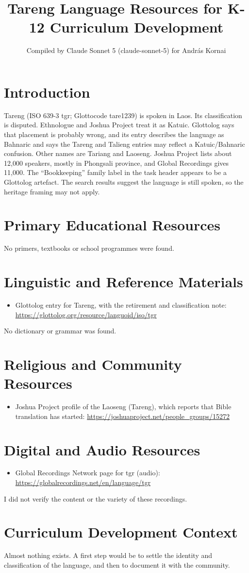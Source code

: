 \documentclass[12pt]{article}
\title{Tareng Language Resources for K-12 Curriculum Development}
\author{Compiled by Claude Sonnet 5 (claude-sonnet-5) for Andr\'as Kornai}
\date{}
\begin{document}
\maketitle

\section{Introduction}
Tareng (ISO 639-3 tgr; Glottocode tare1239) is spoken in Laos. Its classification is disputed. Ethnologue and Joshua Project treat it as Katuic. Glottolog says that placement is probably wrong, and its entry describes the language as Bahnaric and says the Tareng and Talieng entries may reflect a Katuic/Bahnaric confusion. Other names are Tariang and Laoseng. Joshua Project lists about 12,000 speakers, mostly in Phongsali province, and Global Recordings gives 11,000. The ``Bookkeeping'' family label in the task header appears to be a Glottolog artefact. The search results suggest the language is still spoken, so the heritage framing may not apply.

\section{Primary Educational Resources}
No primers, textbooks or school programmes were found.

\section{Linguistic and Reference Materials}
\begin{itemize}
\item Glottolog entry for Tareng, with the retirement and classification note: \url{https://glottolog.org/resource/languoid/iso/tgr}
\end{itemize}
No dictionary or grammar was found.

\section{Religious and Community Resources}
\begin{itemize}
\item Joshua Project profile of the Laoseng (Tareng), which reports that Bible translation has started: \url{https://joshuaproject.net/people_groups/15272}
\end{itemize}

\section{Digital and Audio Resources}
\begin{itemize}
\item Global Recordings Network page for tgr (audio): \url{https://globalrecordings.net/en/language/tgr}
\end{itemize}
I did not verify the content or the variety of these recordings.

\section{Curriculum Development Context}
Almost nothing exists. A first step would be to settle the identity and classification of the language, and then to document it with the community.
\end{document}

